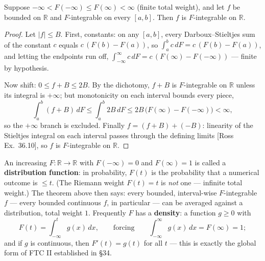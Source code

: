 \documentclass[11pt]{report}
\begin{document}
\begin{thmbox}
Suppose $-\infty < F(-\infty) \leq F(\infty) < \infty$ (finite total weight), and let $f$ be bounded on $\mathbb{R}$ and $F$-integrable on every $[a,b]$. Then $f$ is $F$-integrable on $\mathbb{R}$.
\end{thmbox}

\begin{proof}
Let $|f| \leq B$. First, constants: on any $[a,b]$, every Darboux--Stieltjes sum of the constant $c$ equals $c\,(F(b) - F(a))$, so $\int_a^b c\,dF = c\,(F(b)-F(a))$, and letting the endpoints run off, $\int_{-\infty}^\infty c\,dF = c\,(F(\infty) - F(-\infty))$ --- finite by hypothesis.

Now shift: $0 \leq f + B \leq 2B$. By the dichotomy, $f + B$ is $F$-integrable on $\mathbb{R}$ unless its integral is $+\infty$; but monotonicity on each interval bounds every piece,
\[
\int_a^b (f + B)\,dF \leq \int_a^b 2B\,dF \leq 2B\,\bigl( F(\infty) - F(-\infty) \bigr) < \infty,
\]
so the $+\infty$ branch is excluded. Finally $f = (f + B) + (-B)$: linearity of the Stieltjes integral on each interval passes through the defining limits [Ross Ex.\ 36.10], so $f$ is $F$-integrable on $\mathbb{R}$.
\end{proof}

\begin{rembox}
An increasing $F: \mathbb{R} \to \mathbb{R}$ with $F(-\infty) = 0$ and $F(\infty) = 1$ is called a \textbf{distribution function}: in probability, $F(t)$ is the probability that a numerical outcome is $\leq t$. (The Riemann weight $F(t) = t$ is \emph{not} one --- infinite total weight.) The theorem above then says: every bounded, interval-wise $F$-integrable $f$ --- every bounded continuous $f$, in particular --- can be averaged against a distribution, total weight $1$. Frequently $F$ has a \textbf{density}: a function $g \geq 0$ with
\[
F(t) = \int_{-\infty}^t g(x)\,dx, \qquad \text{forcing} \qquad \int_{-\infty}^\infty g(x)\,dx = F(\infty) = 1;
\]
and if $g$ is continuous, then $F'(t) = g(t)$ for all $t$ --- this is exactly the global form of FTC II established in \S 34.
\end{rembox}
\end{document}
